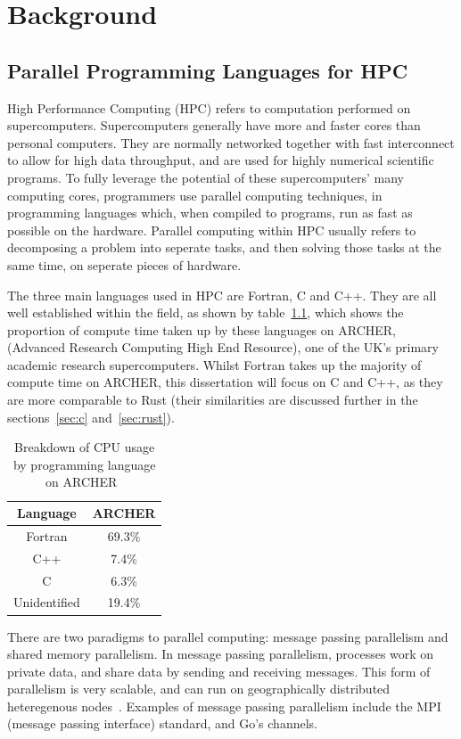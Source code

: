 \chapter{Background}
\section{Parallel Programming Languages for HPC}
High Performance Computing (HPC) refers to computation performed on supercomputers. 
Supercomputers generally have more and faster cores than personal computers. They are normally networked together with fast interconnect to allow for high data throughput, and are used for highly numerical scientific programs.
To fully leverage the potential of these supercomputers' many computing cores, programmers use parallel computing techniques, in programming languages which, when compiled to programs, run as fast as possible on the hardware. Parallel computing within HPC usually refers to decomposing a problem into seperate tasks, and then solving those tasks at the same time, on seperate pieces of hardware.

The three main languages used in HPC are Fortran, C and C++. They are all well established within the field, as shown by table~\ref{tab:langs}, which shows the proportion of compute time taken up by these languages on ARCHER, (Advanced Research Computing High End Resource), one of the UK's primary academic research supercomputers.
Whilst Fortran takes up the majority of compute time on ARCHER, this dissertation will focus on C and C++, as they are more comparable to Rust (their similarities are discussed further in the sections~\ref{sec:c} and~\ref{sec:rust}).

\begin{table}[h]
  \centering
  \begin{tabular}{|c|c|}
    \hline
    Language & \textbf{ARCHER} \\
    \hline
    Fortran & 69.3\% \\
    \hline
    C++ & 7.4\% \\
    \hline
    C & 6.3\% \\
    \hline
    Unidentified & 19.4\% \\
    \hline
  \end{tabular}
  \caption{Breakdown of CPU usage by programming language on ARCHER~\cite{Turner2015}}
  \label{tab:langs}
\end{table}

There are two paradigms to parallel computing: message passing parallelism and shared memory parallelism. In message passing parallelism, processes work on private data, and share data by sending and receiving messages. This form of parallelism is very scalable, and can run on geographically distributed heteregenous nodes~\cite{SETI}. Examples of message passing parallelism include the MPI (message passing interface) standard, and Go's channels.


